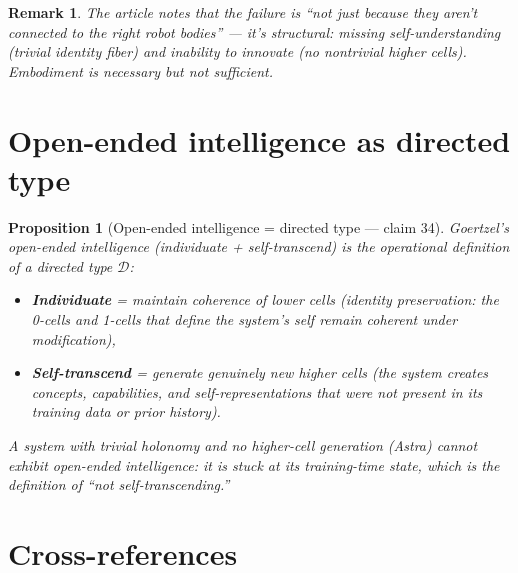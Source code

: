\documentclass[11pt,a4paper]{article}
\newtheorem{proposition}[definition]{Proposition}
\newtheorem{remark}[definition]{Remark}
\begin{document}
\begin{remark}
The article notes that the failure is ``not just because they aren't
connected to the right robot bodies'' --- it's structural: missing
self-understanding (trivial identity fiber) and inability to innovate
(no nontrivial higher cells). Embodiment is necessary but not sufficient.
\end{remark}

\section{Open-ended intelligence as directed type}
\label{sec:open-ended}

\begin{proposition}[Open-ended intelligence = directed type --- claim 34]
\label{prop:open-ended}
Goertzel's open-ended intelligence (individuate + self-transcend) is the
operational definition of a directed type $\mathcal{D}$:
\begin{itemize}
\item \textbf{Individuate} = maintain coherence of lower cells (identity
  preservation: the 0-cells and 1-cells that define the system's self
  remain coherent under modification),
\item \textbf{Self-transcend} = generate genuinely new higher cells
  (the system creates concepts, capabilities, and self-representations
  that were not present in its training data or prior history).
\end{itemize}
A system with trivial holonomy and no higher-cell generation (Astra)
cannot exhibit open-ended intelligence: it is stuck at its training-time
state, which is the definition of ``not self-transcending.''
\end{proposition}

\section{Cross-references}
\end{document}
